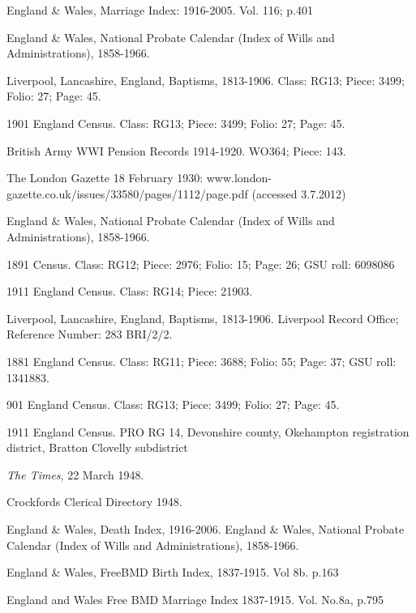 \begin{thebibliography}{99}
	England \& Wales, Marriage Index: 1916-2005. Vol. 116; p.401

	 England \& Wales, National Probate Calendar (Index of Wills and Administrations), 1858-1966. 
	
	Liverpool, Lancashire, England, Baptisms, 1813-1906.
	Class: RG13; Piece: 3499; Folio: 27; Page: 45.
	
	1901 England Census.
	Class: RG13; Piece: 3499; Folio: 27; Page: 45.

	British Army WWI Pension Records 1914-1920.  WO364; Piece: 143.

	 The London Gazette 18 February 1930: www.london-gazette.co.uk/issues/33580/pages/1112/page.pdf (accessed 3.7.2012)

	England \& Wales, National Probate Calendar (Index of Wills and Administrations), 1858-1966. 

	1891 Census. Class: RG12; Piece: 2976; Folio: 15; Page: 26; GSU roll: 6098086

	1911 England Census. Class: RG14; Piece: 21903.

	Liverpool, Lancashire, England, Baptisms, 1813-1906.
	Liverpool Record Office; Reference Number: 283 BRI/2/2.
	
	1881 England Census. Class: RG11; Piece: 3688; Folio: 55; Page: 37; GSU roll: 1341883.
	
	901 England Census. Class: RG13; Piece: 3499; Folio: 27; Page: 45.
	
	1911 England Census. PRO RG 14, Devonshire county, Okehampton registration district, 
	Bratton Clovelly subdistrict
	
	\emph{The Times}, 22 March 1948.

	 Crockfords Clerical Directory 1948. 
	 
	 England \& Wales, Death Index, 1916-2006.
	 England \& Wales, National Probate Calendar (Index of Wills and Administrations), 1858-1966. 
	 
	England \& Wales, FreeBMD Birth Index, 1837-1915. Vol 8b. p.163
	
	England and Wales Free BMD Marriage Index 1837-1915. Vol. No.8a, p.795
	

\end{thebibliography}
